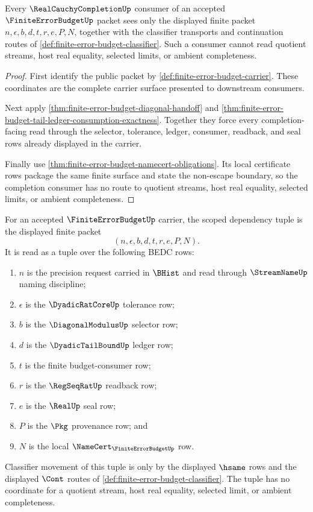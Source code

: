 \begin{theorem}
\label{thm:finite-error-budget-completion-consumer-boundary}
Every $\RealCauchyCompletionUp$ consumer of an accepted
$\FiniteErrorBudgetUp$ packet sees only the displayed finite packet
$n,\epsilon,b,d,t,r,e,P,N$, together with the classifier transports and
continuation routes of \autoref{def:finite-error-budget-classifier}. Such a
consumer cannot read quotient streams, host real equality, selected limits, or
ambient completeness.
\end{theorem}
\begin{proof}
First identify the public packet by
\autoref{def:finite-error-budget-carrier}. These coordinates are the complete
carrier surface presented to downstream consumers.

Next apply \autoref{thm:finite-error-budget-diagonal-handoff} and
\autoref{thm:finite-error-budget-tail-ledger-consumption-exactness}. Together
they force every completion-facing read through the selector, tolerance,
ledger, consumer, readback, and seal rows already displayed in the carrier.

Finally use \autoref{thm:finite-error-budget-namecert-obligations}. Its local
certificate rows package the same finite surface and state the non-escape
boundary, so the completion consumer has no route to quotient streams, host
real equality, selected limits, or ambient completeness.
\end{proof}

\begin{definition}
\label{def:finite-error-budget-scoped-dependency-tuple}
For an accepted $\FiniteErrorBudgetUp$ carrier, the scoped dependency tuple is
the displayed finite packet
$$
(n,\epsilon,b,d,t,r,e,P,N).
$$
It is read as a tuple over the following BEDC rows:
\begin{enumerate}
\item $n$ is the precision request carried in $\BHist$ and read through
$\StreamNameUp$ naming discipline;
\item $\epsilon$ is the $\DyadicRatCoreUp$ tolerance row;
\item $b$ is the $\DiagonalModulusUp$ selector row;
\item $d$ is the $\DyadicTailBoundUp$ ledger row;
\item $t$ is the finite budget-consumer row;
\item $r$ is the $\RegSeqRatUp$ readback row;
\item $e$ is the $\RealUp$ seal row;
\item $P$ is the $\Pkg$ provenance row; and
\item $N$ is the local $\NameCert_{\FiniteErrorBudgetUp}$ row.
\end{enumerate}
Classifier movement of this tuple is only by the displayed $\hsame$ rows and
the displayed $\Cont$ routes of
\autoref{def:finite-error-budget-classifier}. The tuple has no coordinate for
a quotient stream, host real equality, selected limit, or ambient completeness.
\end{definition}

